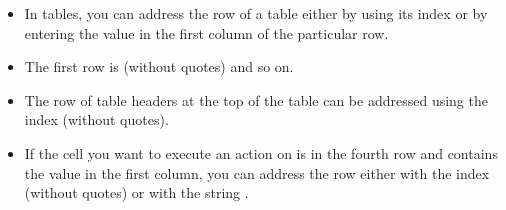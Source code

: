 \begin{itemize}
\item In tables, you can address the row of a table either by using its index or by entering the value in the first column of the particular row. 
\item The first row is  (without quotes) and so on.
\item The row of table headers at the top of the table can be addressed using the index  (without quotes). 
\item If the cell you want to execute an action on is in the fourth row and  contains the value  in the first column, you can address the row  either with the index  (without quotes) or with the string .  
\end{itemize}    
